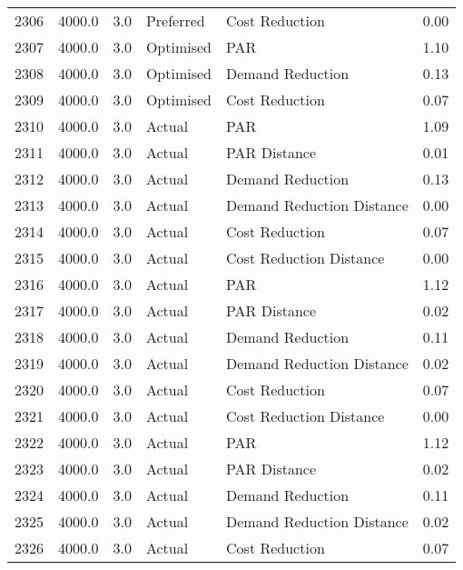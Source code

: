\begin{longtable}{lrrllr}
2306 &       4000.0 &     3.0 &      Preferred &             Cost Reduction &   0.00 \\
2307 &       4000.0 &     3.0 &      Optimised &                        PAR &   1.10 \\
2308 &       4000.0 &     3.0 &      Optimised &           Demand Reduction &   0.13 \\
2309 &       4000.0 &     3.0 &      Optimised &             Cost Reduction &   0.07 \\
2310 &       4000.0 &     3.0 &         Actual &                        PAR &   1.09 \\
2311 &       4000.0 &     3.0 &         Actual &               PAR Distance &   0.01 \\
2312 &       4000.0 &     3.0 &         Actual &           Demand Reduction &   0.13 \\
2313 &       4000.0 &     3.0 &         Actual &  Demand Reduction Distance &   0.00 \\
2314 &       4000.0 &     3.0 &         Actual &             Cost Reduction &   0.07 \\
2315 &       4000.0 &     3.0 &         Actual &    Cost Reduction Distance &   0.00 \\
2316 &       4000.0 &     3.0 &         Actual &                        PAR &   1.12 \\
2317 &       4000.0 &     3.0 &         Actual &               PAR Distance &   0.02 \\
2318 &       4000.0 &     3.0 &         Actual &           Demand Reduction &   0.11 \\
2319 &       4000.0 &     3.0 &         Actual &  Demand Reduction Distance &   0.02 \\
2320 &       4000.0 &     3.0 &         Actual &             Cost Reduction &   0.07 \\
2321 &       4000.0 &     3.0 &         Actual &    Cost Reduction Distance &   0.00 \\
2322 &       4000.0 &     3.0 &         Actual &                        PAR &   1.12 \\
2323 &       4000.0 &     3.0 &         Actual &               PAR Distance &   0.02 \\
2324 &       4000.0 &     3.0 &         Actual &           Demand Reduction &   0.11 \\
2325 &       4000.0 &     3.0 &         Actual &  Demand Reduction Distance &   0.02 \\
2326 &       4000.0 &     3.0 &         Actual &             Cost Reduction &   0.07 \\

\end{longtable}

